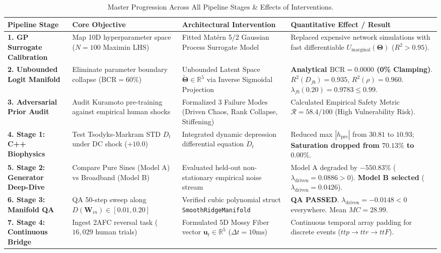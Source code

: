 \documentclass[11pt,a4paper]{article}
\begin{document}
\begin{table}[H]
\centering
\caption{Master Progression Across All Pipeline Stages \& Effects of Interventions.}
\label{tab:master_summary}
\vspace{0.5em}
\scriptsize
\begin{tabular}{p{2.2cm} p{4.2cm} p{4.2cm} p{4.2cm}}
\toprule
\textbf{Pipeline Stage} & \textbf{Core Objective} & \textbf{Architectural Intervention} & \textbf{Quantitative Effect / Result} \\
\midrule
\textbf{1. GP Surrogate Calibration} & Map 10D hyperparameter space ($N=100$ Maximin LHS) & Fitted Matérn 5/2 Gaussian Process Surrogate Model & Replaced expensive network simulations with fast differentiable $U_{\text{marginal}}(\boldsymbol{\Theta})$ ($R^2 > 0.95$). \\
\midrule
\textbf{2. Unbounded Logit Manifold} & Eliminate parameter boundary collapse ($\text{BCR} = 60\%$) & Unbounded Latent Space $\tilde{\boldsymbol{\Theta}} \in \mathbb{R}^5$ via Inverse Sigmoidal Projection & \textbf{Analytical $\text{BCR} = 0.0000$ (0\% Clamping)}. $R^2(D_{fb})=0.935$, $R^2(\rho)=0.960$. $\lambda_{fb}(0.20)=0.9783 \le 0.99$. \\
\midrule
\textbf{3. Adversarial Prior Audit} & Audit Kuramoto pre-training against empirical human shocks & Formalized 3 Failure Modes (Driven Chaos, Rank Collapse, Stiffening) & Calculated Empirical Safety Metric $\mathcal{R} = 58.4 / 100$ (High Vulnerability Risk). \\
\midrule
\textbf{4. Stage 1: C++ Biophysics} & Test Tsodyks-Markram STD $D_t$ under DC shock ($+10.0$) & Integrated dynamic depression differential equation $\dot{D}_t$ & Reduced max $|h_{\text{pre}}|$ from $30.81$ to $10.93$; \textbf{Saturation dropped from $70.13\%$ to $0.00\%$}. \\
\midrule
\textbf{5. Stage 2: Generator Deep-Dive} & Compare Pure Sines (Model A) vs Broadband (Model B) & Evaluated held-out non-stationary empirical noise stream & Model A degraded by $-550.83\%$ ($\lambda_{\text{driven}}=0.0886 > 0$). \textbf{Model B selected} ($\lambda_{\text{driven}}=0.0426$). \\
\midrule
\textbf{6. Stage 3: Manifold QA} & QA 50-step sweep along $D(\mathbf{W}_{in}) \in [0.01, 0.20]$ & Verified cubic polynomial struct \texttt{SmoothRidgeManifold} & \textbf{QA PASSED}. $\lambda_{\text{driven}} = -0.0148 < 0$ everywhere. Mean $MC = 28.99$. \\
\midrule
\textbf{7. Stage 4: Continuous Bridge} & Ingest 2AFC reversal task ($16,029$ human trials) & Formulated 5D Mossy Fiber vector $\mathbf{u}_t \in \mathbb{R}^5$ ($\Delta t = 10\text{ms}$) & Continuous temporal array padding for discrete events ($ttp \to ttr \to ttF$). \\

\end{tabular}
\end{table}
\end{document}
